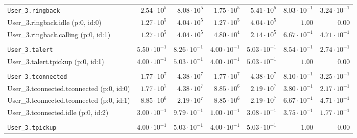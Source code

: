 \begin{table}[htbp]
{\begin{tabular}{lrrrrrr}
\\[-8pt]\texttt{User\_3.ringback}                     &  $2.54 \cdot 10^{5}$ &  $8.08 \cdot 10^{5}$ &  $1.75 \cdot 10^{5}$ &  $5.41 \cdot 10^{5}$ & $8.03 \cdot 10^{-1}$ & $3.24 \cdot 10^{-1}$ \\
\hspace{3mm}User\_3.ringback.idle (p:0, id:0)         &  $1.27 \cdot 10^{5}$ &  $4.04 \cdot 10^{5}$ &  $1.27 \cdot 10^{5}$ &  $4.04 \cdot 10^{5}$ &               $1.00$ &               $0.00$ \\
\hspace{3mm}User\_3.ringback.calling (p:0, id:1)      &  $1.27 \cdot 10^{5}$ &  $4.04 \cdot 10^{5}$ &  $4.80 \cdot 10^{4}$ &  $2.14 \cdot 10^{5}$ & $6.67 \cdot 10^{-1}$ & $4.71 \cdot 10^{-1}$ \\
\\[-8pt]\texttt{User\_3.talert}                       & $5.50 \cdot 10^{-1}$ & $8.26 \cdot 10^{-1}$ & $4.00 \cdot 10^{-1}$ & $5.03 \cdot 10^{-1}$ & $8.54 \cdot 10^{-1}$ & $2.74 \cdot 10^{-1}$ \\
\hspace{3mm}User\_3.talert.tpickup (p:0, id:1)        & $4.00 \cdot 10^{-1}$ & $5.03 \cdot 10^{-1}$ & $4.00 \cdot 10^{-1}$ & $5.03 \cdot 10^{-1}$ &               $1.00$ &               $0.00$ \\
\\[-8pt]\texttt{User\_3.tconnected}                   &  $1.77 \cdot 10^{7}$ &  $4.38 \cdot 10^{7}$ &  $1.77 \cdot 10^{7}$ &  $4.38 \cdot 10^{7}$ & $8.10 \cdot 10^{-1}$ & $3.25 \cdot 10^{-1}$ \\
\hspace{3mm}User\_3.tconnected.tconnected (p:0, id:0) &  $1.77 \cdot 10^{7}$ &  $4.38 \cdot 10^{7}$ &  $8.85 \cdot 10^{6}$ &  $2.19 \cdot 10^{7}$ & $3.80 \cdot 10^{-1}$ & $2.17 \cdot 10^{-1}$ \\
\hspace{3mm}User\_3.tconnected.tconnected (p:0, id:1) &  $8.85 \cdot 10^{6}$ &  $2.19 \cdot 10^{7}$ &  $8.85 \cdot 10^{6}$ &  $2.19 \cdot 10^{7}$ & $6.67 \cdot 10^{-1}$ & $4.71 \cdot 10^{-1}$ \\
\hspace{3mm}User\_3.tconnected.idle (p:0, id:2)       & $3.00 \cdot 10^{-1}$ & $9.79 \cdot 10^{-1}$ & $1.00 \cdot 10^{-1}$ & $3.08 \cdot 10^{-1}$ & $3.75 \cdot 10^{-1}$ & $1.77 \cdot 10^{-1}$ \\
\\[-8pt]\texttt{User\_3.tpickup}                      & $4.00 \cdot 10^{-1}$ & $5.03 \cdot 10^{-1}$ & $4.00 \cdot 10^{-1}$ & $5.03 \cdot 10^{-1}$ &               $1.00$ &               $0.00$ \\

\end{tabular}}
\end{table}
